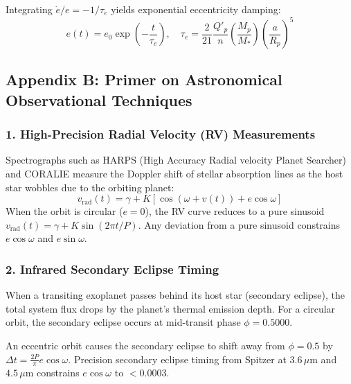 \documentclass[11pt,a4paper]{article}
\begin{document}
Integrating $\dot{e} / e = -1 / \tau_e$ yields exponential eccentricity damping:
\begin{equation}
e(t) = e_0 \exp\left(-\frac{t}{\tau_e}\right), \quad \tau_e = \frac{2}{21} \frac{Q'_p}{n} \left(\frac{M_p}{M_*}\right) \left(\frac{a}{R_p}\right)^5
\end{equation}

\subsection*{Appendix B: Primer on Astronomical Observational Techniques}

\subsubsection*{1. High-Precision Radial Velocity (RV) Measurements}
Spectrographs such as HARPS (High Accuracy Radial velocity Planet Searcher) and CORALIE measure the Doppler shift of stellar absorption lines as the host star wobbles due to the orbiting planet:
\begin{equation}
v_{\text{rad}}(t) = \gamma + K \left[ \cos(\omega + v(t)) + e \cos \omega \right]
\end{equation}
When the orbit is circular ($e = 0$), the RV curve reduces to a pure sinusoid $v_{\text{rad}}(t) = \gamma + K \sin(2\pi t / P)$. Any deviation from a pure sinusoid constrains $e \cos \omega$ and $e \sin \omega$.

\subsubsection*{2. Infrared Secondary Eclipse Timing}
When a transiting exoplanet passes behind its host star (secondary eclipse), the total system flux drops by the planet's thermal emission depth. For a circular orbit, the secondary eclipse occurs at mid-transit phase $\phi = 0.5000$. 

An eccentric orbit causes the secondary eclipse to shift away from $\phi = 0.5$ by $\Delta t = \frac{2 P}{\pi} e \cos \omega$. Precision secondary eclipse timing from Spitzer at $3.6\,\mu\text{m}$ and $4.5\,\mu\text{m}$ constrains $e \cos \omega$ to $< 0.0003$.
\end{document}
